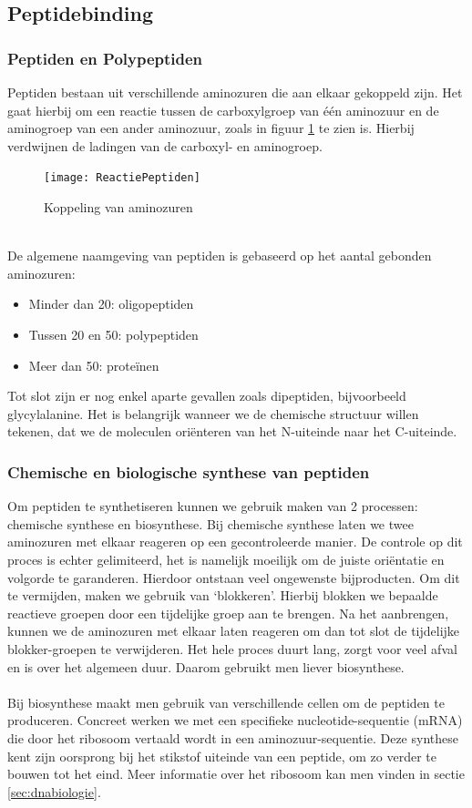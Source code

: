 \documentclass[a4paper,kul]{kulakarticle} %
\begin{document}
\subsection{Peptidebinding}
\subsubsection{Peptiden en Polypeptiden}
Peptiden bestaan uit verschillende aminozuren die aan elkaar gekoppeld zijn. Het gaat hierbij om een reactie tussen de carboxylgroep van één aminozuur en de aminogroep van een ander aminozuur, zoals in figuur \ref{fig:reactiepeptiden} te zien is. Hierbij verdwijnen de ladingen van de carboxyl- en aminogroep.
\begin{figure}[h]
	\centering
	\texttt{[image: ReactiePeptiden]}
	\caption[Reactie peptiden]{Koppeling van aminozuren}
	\label{fig:reactiepeptiden}
\end{figure}\\
De algemene naamgeving van peptiden is gebaseerd op het aantal gebonden aminozuren: 
\begin{itemize}
	\item Minder dan 20: oligopeptiden
	\item Tussen 20 en 50: polypeptiden
	\item Meer dan 50: proteïnen
\end{itemize} 
Tot slot zijn er nog enkel aparte gevallen zoals dipeptiden, bijvoorbeeld glycylalanine. Het is belangrijk wanneer we de chemische structuur willen tekenen, dat we de moleculen oriënteren van het N-uiteinde naar het C-uiteinde.

\subsubsection{Chemische en biologische synthese van peptiden}
Om peptiden te synthetiseren kunnen we gebruik maken van 2 processen: chemische synthese en biosynthese. Bij chemische synthese laten we twee aminozuren met elkaar reageren op een gecontroleerde manier. De controle op dit proces is echter gelimiteerd, het is namelijk moeilijk om de juiste oriëntatie en volgorde te garanderen. Hierdoor ontstaan veel ongewenste bijproducten. Om dit te vermijden, maken we gebruik van `blokkeren'. Hierbij blokken we bepaalde reactieve groepen door een tijdelijke groep aan te brengen. Na het aanbrengen, kunnen we de aminozuren met elkaar laten reageren om dan tot slot de tijdelijke blokker-groepen te verwijderen. Het hele proces duurt lang, zorgt voor veel afval en is over het algemeen duur. Daarom gebruikt men liever biosynthese.\\
\\
Bij biosynthese maakt men gebruik van verschillende cellen om de peptiden te produceren. Concreet werken we met een specifieke nucleotide-sequentie (mRNA) die door het ribosoom vertaald wordt in een aminozuur-sequentie. Deze synthese kent zijn oorsprong bij het stikstof uiteinde van een peptide, om zo verder te bouwen tot het eind. Meer informatie over het ribosoom kan men vinden in sectie \ref{sec:dnabiologie}.
\newpage
\end{document}
